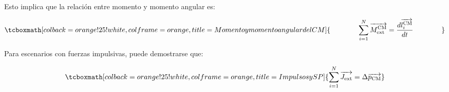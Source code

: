 \documentclass{article}
\begin{document}
Esto implica que la relación entre momento y momento angular es:

\begin{equation}
\tcboxmath[colback=orange!25!white,colframe=orange,title=Momento y momento angular del CM]{
\qquad \qquad \sum_{i=1}^N \overrightarrow{M_{\text{ext}}^{\text{CM}}} = \frac{d\overrightarrow{l^{\text{CM}}_i}}{\mathop{dt}} \qquad \qquad
}
\end{equation}

Para escenarios con fuerzas impulsivas, puede demostrarse que:

\begin{equation}
\tcboxmath[colback=orange!25!white,colframe=orange,title=Impulsos y SP]{
\sum_{i=1}^N \overrightarrow{J_{\text{ext}}} = \Delta \overrightarrow{p_{\text{CM}}}
}
\end{equation}
\end{document}
